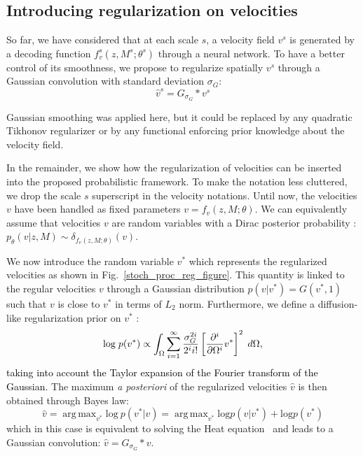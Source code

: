 \documentclass[journal]{IEEEtran}
\newcommand{\update}[1]{\textcolor{black}{#1}}
\DeclareMathOperator*{\argmax}{arg\,max}
\begin{document}
\subsection{Introducing regularization on velocities}
So far, we have considered that at each scale $s$, a velocity field $v^s$ is generated by a decoding function $f_v^s(z,M^s;\theta^s)$ through a neural network. To have a better control of its smoothness, we propose to regularize spatially $v^s$ through a Gaussian convolution with standard deviation $\sigma_G$: 
\begin{equation}\label{gaussianfilter}
\hat{v}^s = G_{\sigma_G} \ast v^s
\end{equation}

Gaussian smoothing  was applied here, but it could be replaced by any quadratic Tikhonov regularizer or by any  functional enforcing prior knowledge about the velocity field.

In the remainder, we show how the regularization of velocities can be inserted into the proposed probabilistic framework.  To make the notation less cluttered, we drop the scale $s$ superscript in the velocity notations.  Until now, the velocities $v$ have been handled as fixed parameters $v=f_v(z,M;\theta)$. We can equivalently assume that velocities $v$ are random variables with a Dirac posterior probability : $p_\theta(v|z,M) \sim \delta_{f_v(z,M;\theta)} (v)$. 

We now introduce the random variable $v^*$ which represents the regularized velocities as shown in Fig.~\ref{stoch_proc_reg_figure}. This quantity is linked to  the  regular velocities $v$ through a Gaussian distribution $p(v|v^*)=G(v^*,1)$ such that $v$ is close to $v^*$ in terms of $L_2$ norm. Furthermore, we define a  diffusion-like regularization prior on $v^*$ \cite{nielsen1997regularization}:
\begin{equation*}
\text{log} \hspace{1mm} p(v^*) \propto \int_\Omega \sum_{i=1}^\infty \update{\frac{\sigma_G^{2i}}{2^i i!}} \left[ \frac{\partial^i}{\partial \Omega^i} v^*\right]^2 \hspace{1mm} d\Omega,
\end{equation*}
\update{taking into account the Taylor expansion of the Fourier transform of the Gaussian.} The maximum {\em a posteriori} of the regularized velocities  $\hat{v}$ is then obtained through Bayes law:
\begin{equation}
\hat{v} = \argmax_{v^*} \mathrm{log} ~ p(v^*|v) =\argmax_{v^*} \mathrm{log} p(v|v^*) +  \mathrm{log} p(v^*)\nonumber
\end{equation}
which in this case is equivalent to solving the Heat equation~\cite{nielsen1997regularization} and leads to a Gaussian convolution: $\hat{v} = G_{\sigma_G} \ast v$.
\end{document}
